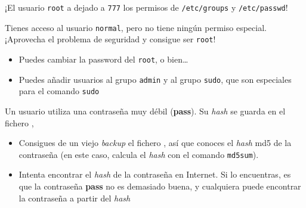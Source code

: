 \begin{homeworkProblem}

  \begin{multicols}{2}

    \null \vfill
    \begin{Actividad}
      ¡El usuario \texttt{root} a dejado a \texttt{777} los permisos de \texttt{/etc/groups} y \texttt{/etc/passwd}!


    \end{Actividad}
    \vfill \null
    \columnbreak



    \begin{Actividad}
      Tienes acceso al usuario \texttt{normal}, pero no tiene ningún permiso especial. ¡Aprovecha el problema de seguridad y consigue ser \texttt{root}!
      \begin{itemize}
      \item Puedes cambiar la password del \texttt{root}, o bien…
      \item Puedes añadir usuarios al grupo \texttt{admin} y al grupo \texttt{sudo}, que son especiales para el comando \texttt{sudo}
      \end{itemize}
    \end{Actividad}



  \end{multicols}


\end{homeworkProblem}


\begin{homeworkProblem}

  \begin{multicols}{2}

    \null \vfill
    \begin{Actividad}
      Un usuario utiliza una contraseña muy débil (\textbf{pass}). Su \textit{hash} se guarda en el fichero ,
    \end{Actividad}
    \vfill \null
    \columnbreak


    \begin{Actividad}
      \begin{itemize}
      \item Consigues de un viejo \textit{backup} el fichero , así que conoces el \textit{hash} md5 de la contraseña (en este caso, calcula el \textit{hash} con el comando \texttt{md5sum}).  
      \item Intenta encontrar el \textit{hash} de la contraseña en Internet. Si lo encuentras, es que la contraseña \textbf{pass} no es demasiado buena, y cualquiera puede encontrar la contraseña a partir del \textit{hash} 
      \end{itemize}
    \end{Actividad}
  \end{multicols}

\end{homeworkProblem}


